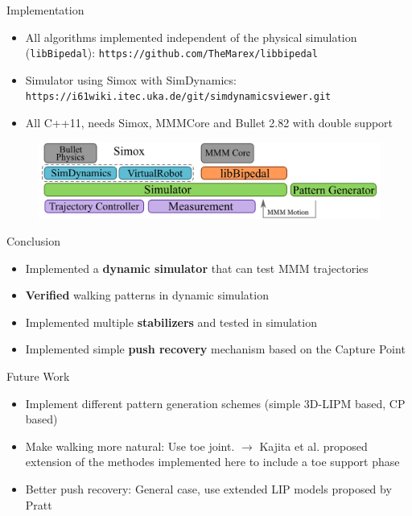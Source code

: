 \begin{frame}{Implementation}

\begin{itemize}
\item
  All algorithms implemented independent of the physical simulation
  (\texttt{libBipedal}): \texttt{https://github.com/TheMarex/libbipedal}
\item
  Simulator using Simox with SimDynamics:
  \texttt{https://i61wiki.itec.uka.de/git/simdynamicsviewer.git}
\item
  All C++11, needs Simox, MMMCore and Bullet 2.82 with double support
\end{itemize}

\begin{figure}
  \begin{center}
     \includegraphics[width=\textwidth]{images/architechture.png}
  \end{center}
\end{figure}

\end{frame}

\begin{frame}{Conclusion}

\begin{itemize}
\itemsep1pt\parskip0pt
\item
  Implemented a \textbf{dynamic simulator} that can test MMM
  trajectories
\item
  \textbf{Verified} walking patterns in dynamic simulation
\item
  Implemented multiple \textbf{stabilizers} and tested in simulation
\item
  Implemented simple \textbf{push recovery} mechanism based on the
  Capture Point
\end{itemize}

\end{frame}

\begin{frame}{Future Work}

\begin{itemize}
\item
  Implement different pattern generation schemes (simple 3D-LIPM based,
  CP based)
\item
  Make walking more natural: Use toe joint. \(\rightarrow\) Kajita et
  al. \cite{kajita2012evaluation} proposed extension of the methodes
  implemented here to include a toe support phase
\item
  Better push recovery: General case, use extended LIP models proposed
  by Pratt
\end{itemize}

\end{frame}
